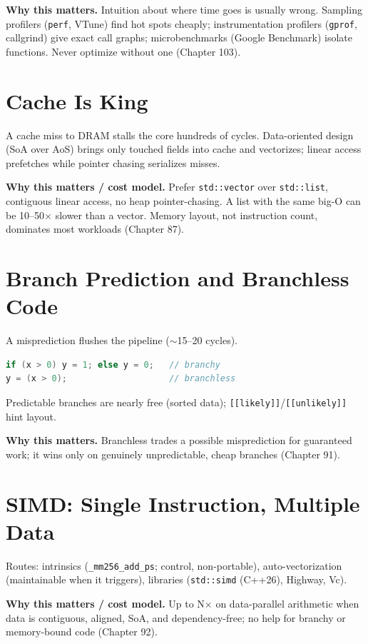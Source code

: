 \textbf{Why this matters.} Intuition about where time goes is usually wrong. Sampling profilers (\texttt{perf}, VTune) find hot spots cheaply; instrumentation profilers (\texttt{gprof}, callgrind) give exact call graphs; microbenchmarks (Google Benchmark) isolate functions. Never optimize without one (Chapter 103).

\section{Cache Is King}
A cache miss to DRAM stalls the core hundreds of cycles. Data-oriented design (SoA over AoS) brings only touched fields into cache and vectorizes; linear access prefetches while pointer chasing serializes misses.

\textbf{Why this matters / cost model.} Prefer \texttt{std::vector} over \texttt{std::list}, contiguous linear access, no heap pointer-chasing. A list with the same big-O can be 10--50$\times$ slower than a vector. Memory layout, not instruction count, dominates most workloads (Chapter 87).

\section{Branch Prediction and Branchless Code}
A misprediction flushes the pipeline ($\sim$15--20 cycles).

\begin{lstlisting}[language=C++, caption={Replacing an unpredictable branch with computation. Min standard: C++11/C++20.}]
if (x > 0) y = 1; else y = 0;   // branchy
y = (x > 0);                    // branchless
\end{lstlisting}

Predictable branches are nearly free (sorted data); \texttt{[[likely]]}/\texttt{[[unlikely]]} hint layout.

\textbf{Why this matters.} Branchless trades a possible misprediction for guaranteed work; it wins only on genuinely unpredictable, cheap branches (Chapter 91).

\section{SIMD: Single Instruction, Multiple Data}
Routes: intrinsics (\texttt{\_mm256\_add\_ps}; control, non-portable), auto-vectorization (maintainable when it triggers), libraries (\texttt{std::simd} (C++26), Highway, Vc).

\textbf{Why this matters / cost model.} Up to N$\times$ on data-parallel arithmetic when data is contiguous, aligned, SoA, and dependency-free; no help for branchy or memory-bound code (Chapter 92).

